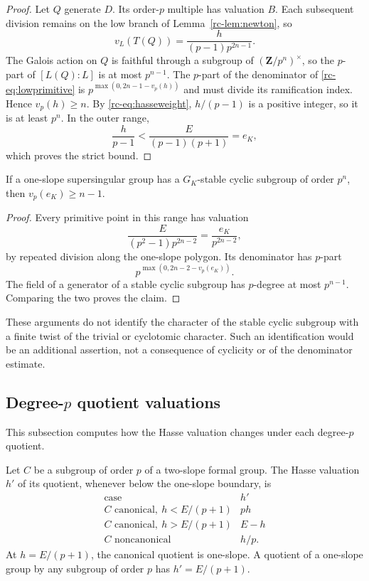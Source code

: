 \begin{proof}
Let $Q$ generate $D$. Its order-$p$ multiple has valuation $B$.
Each subsequent division remains on the low branch of
Lemma~\ref{rc-lem:newton}, so
\begin{equation}\label{rc-eq:lowprimitive}
 v_L(T(Q))=\frac h{(p-1)p^{2n-1}}.
\end{equation}
The Galois action on $Q$ is faithful through a subgroup of
$(\mathbf Z/p^n)^\times$, so the $p$-part of $[L(Q):L]$ is at most
$p^{n-1}$. The $p$-part of the denominator of
\eqref{rc-eq:lowprimitive} is $p^{\max(0,2n-1-v_p(h))}$ and must divide its
ramification index. Hence $v_p(h)\geq n$.
By \eqref{rc-eq:hasseweight}, $h/(p-1)$ is a positive integer, so it is at
least $p^n$. In the outer range,
\[
 \frac h{p-1}<\frac E{(p-1)(p+1)}=e_K,
\]
which proves the strict bound.
\end{proof}

\begin{proposition}\label{rc-prop:oneslopecyclic}
If a one-slope supersingular group has a $G_K$-stable cyclic subgroup of
order $p^n$, then $v_p(e_K)\geq n-1$.
\end{proposition}
\begin{proof}
Every primitive point in this range has valuation
\[
 \frac E{(p^2-1)p^{2n-2}}=\frac{e_K}{p^{2n-2}},
\]
by repeated division along the one-slope polygon. Its denominator has $p$-part
\[p^{\max(0,2n-2-v_p(e_K))}.\] The field of a generator of a stable
cyclic subgroup has $p$-degree at most $p^{n-1}$. Comparing the two proves
the claim.
\end{proof}

These arguments do not identify the character of the stable cyclic
subgroup with a finite twist of the trivial or cyclotomic character. Such
an identification would be an additional assertion, not a consequence of
cyclicity or of the denominator estimate.

\subsection{Degree-\texorpdfstring{$p$}{p} quotient valuations}
This subsection computes how the Hasse valuation changes under each degree-$p$ quotient.


\begin{proposition}\label{rc-prop:quotients}
Let $C$ be a subgroup of order $p$ of a two-slope formal group. The Hasse
valuation $h'$ of its quotient, whenever below the one-slope boundary, is
\[
\begin{array}{c|c}
\text{case}&h'\\\hline
C\text{ canonical},\ h<E/(p+1)&ph\\
C\text{ canonical},\ h>E/(p+1)&E-h\\
C\text{ noncanonical}&h/p.
\end{array}
\]
At $h=E/(p+1)$, the canonical quotient is one-slope. A quotient of a
one-slope group by any subgroup of order $p$ has $h'=E/(p+1)$.
\end{proposition}

